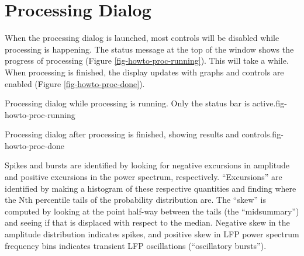 %
%
\clearpage
\section{Processing Dialog}
\label{sect-howto-processing}

When the processing dialog is launched, most controls will be disabled while
processing is happening. The status message at the top of the window shows
the progress of processing (Figure \ref{fig-howto-proc-running}). This will
take a while. When processing is finished, the display updates with graphs
and controls are enabled (Figure \ref{fig-howto-proc-done}).

{Processing dialog while processing is running. Only the status bar is
active.}{fig-howto-proc-running}

{Processing dialog after processing is finished, showing results and
controls.}{fig-howto-proc-done}

Spikes and bursts are identified by looking for negative excursions in
amplitude and positive excursions in the power spectrum, respectively.
``Excursions'' are identified by making a histogram of these respective
quantities and finding where the Nth percentile tails of the probability
distribution are. The ``skew'' is computed by looking at the point half-way
between the tails (the ``midsummary'') and seeing if that is displaced with
respect to the median. Negative skew in the amplitude distribution indicates
spikes, and positive skew in LFP power spectrum frequency bins indicates
transient LFP oscillations (``oscillatory bursts'').

